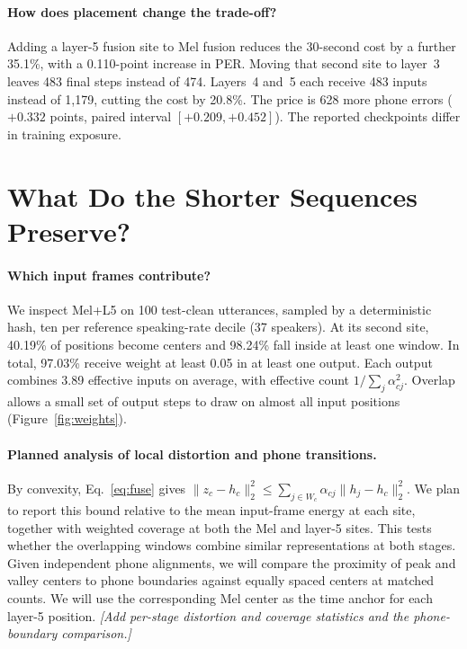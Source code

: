 \documentclass[11pt]{article}
\begin{document}
\paragraph{How does placement change the trade-off?}
Adding a layer-5 fusion site to Mel fusion reduces the 30-second cost by a further 35.1\%, with a 0.110-point increase in PER. Moving that second site to layer~3 leaves 483 final steps instead of 474. Layers~4 and~5 each receive 483 inputs instead of 1,179, cutting the cost by 20.8\%. The price is 628 more phone errors ($+0.332$ points, paired interval $[+0.209,+0.452]$). The reported checkpoints differ in training exposure.

\section{What Do the Shorter Sequences Preserve?}

\paragraph{Which input frames contribute?}
We inspect Mel+L5 on 100 test-clean utterances, sampled by a deterministic hash, ten per reference speaking-rate decile (37 speakers). At its second site, 40.19\% of positions become centers and 98.24\% fall inside at least one window. In total, 97.03\% receive weight at least 0.05 in at least one output. Each output combines 3.89 effective inputs on average, with effective count $1/\sum_j\alpha_{cj}^2$. Overlap allows a small set of output steps to draw on almost all input positions (Figure~\ref{fig:weights}).

\paragraph{Planned analysis of local distortion and phone transitions.}
By convexity, Eq.~\ref{eq:fuse} gives
$\|z_c-h_c\|_2^2 \leq \sum_{j\in W_c}\alpha_{cj}\|h_j-h_c\|_2^2$.
We plan to report this bound relative to the mean input-frame energy at each site, together with weighted coverage at both the Mel and layer-5 sites. This tests whether the overlapping windows combine similar representations at both stages. Given independent phone alignments, we will compare the proximity of peak and valley centers to phone boundaries against equally spaced centers at matched counts. We will use the corresponding Mel center as the time anchor for each layer-5 position.
\emph{[Add per-stage distortion and coverage statistics and the phone-boundary comparison.]}
\end{document}
